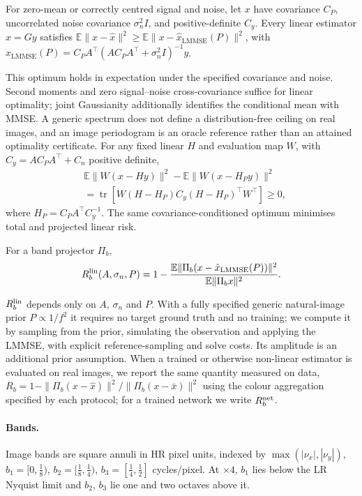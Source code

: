 \begin{proposition}\label{prop:bound}
For zero-mean or correctly centred signal and noise, let $x$ have covariance $C_P$, uncorrelated noise covariance $\sigma_n^2I$, and positive-definite $C_y$. Every linear
estimator $\hat x=Gy$ satisfies
$\mathbb{E}\|x-\hat x\|^2\ge\mathbb{E}\|x-\hat x_{\mathrm{LMMSE}}(P)\|^2$,
with $\hat x_{\mathrm{LMMSE}}(P)=C_PA^\top(AC_PA^\top+\sigma_n^2I)^{-1}y$.
\end{proposition}
This optimum holds in expectation under the specified covariance and noise.
Second moments and zero signal--noise cross-covariance suffice for linear
optimality; joint Gaussianity additionally identifies the conditional mean
with MMSE. A generic spectrum does not define a distribution-free ceiling
on real images, and an image periodogram is an oracle reference rather than
an attained optimality certificate. For any fixed linear $H$ and evaluation
map $W$, with $C_y=AC_PA^\top+C_n$ positive definite,
\begin{align*}
&\mathbb E\|W(x-Hy)\|^2-\mathbb E\|W(x-H_Py)\|^2\\
&=\operatorname{tr}[W(H-H_P)C_y(H-H_P)^\top W^\top]\ge0,
\end{align*}
where $H_P=C_PA^\top C_y^{-1}$. The same covariance-conditioned optimum
minimises total and projected linear risk.

\begin{definition}
For a band projector $\Pi_b$,
\[
R_b^{\mathrm{lin}}(A,\sigma_n,P)=1-\frac{\mathbb{E}\|\Pi_b(x-\hat x_{\mathrm{LMMSE}}(P))\|^2}{\mathbb{E}\|\Pi_b x\|^2}.
\]
\end{definition}
$R_b^{\mathrm{lin}}$ depends only on $A$, $\sigma_n$ and $P$. With a fully specified generic natural-image
prior $P\propto1/f^2$ it requires no target ground truth and no training; we compute
it by sampling from the prior, simulating the observation and applying the
LMMSE, with explicit reference-sampling and solve costs. Its amplitude is an additional prior assumption. When a trained or otherwise non-linear estimator
is evaluated on real images, we report the same quantity measured on data,
$R_b=1-\|\Pi_b(x-\hat x)\|^2/\|\Pi_b(x-\bar x)\|^2$ using the colour aggregation specified by each protocol;
for a trained network we write $R_b^{\mathrm{net}}$.

\paragraph{Bands.} Image bands are square annuli in HR pixel units, indexed by $\max(|\nu_x|,|\nu_y|)$,
$b_1=[0,\tfrac18)$, $b_2=[\tfrac18,\tfrac14)$, $b_3=[\tfrac14,\tfrac12]$
cycles/pixel. At $\times4$, $b_1$ lies below the LR Nyquist limit and
$b_2$, $b_3$ lie one and two octaves above it.

